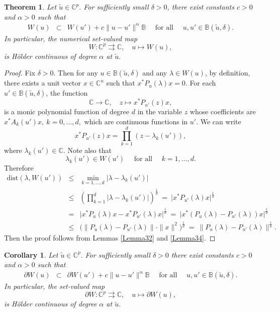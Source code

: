 \documentclass[10pt,reqno]{amsart}
\theoremstyle{break-italic}
\theoremstyle{break-italic}
\theoremstyle{break-italic}
\theoremstyle{break-italic}
\theoremstyle{break-italic}
\theoremstyle{break-italic}
\theoremstyle{break-italic}
\theoremstyle{break-italic}
\newtheorem{theorem}[satz]{Theorem}
\newtheorem{corollary}[satz]{Corollary}
\theoremstyle{break-roman}
\theoremstyle{standard}
\theoremstyle{varthm-roman}
\theoremstyle{varthm-italic}
\theoremstyle{varthm-roman-break}
\theoremstyle{varthm-italic-break}
\theoremstyle{varthm-roman-no-punctuation}
\theoremstyle{varthm-italic-no-punctuation}
\numberwithin{equation}{section}
\begin{document}
\begin{theorem}\label{Theorem33}
Let $\tilde{u} \in \mathbb{C}^p.$ For sufficiently small $\delta > 0$, there exist constants $c > 0$ and $\alpha > 0$ such that
\begin{eqnarray*}
W(u) &\subset& W(u') + c \|u - u'\|^\alpha \mathbb{B} \quad \textrm{ for all } \quad u, u' \in \mathbb{B}(\tilde{u}, \delta).
\end{eqnarray*}
In particular, the numerical  set-valued map
$$W \colon \mathbb{C}^p \rightrightarrows \mathbb{C}, \quad u \mapsto W(u),$$
is H\"older continuous of degree $\alpha$ at $\tilde{u}.$
\end{theorem}

\begin{proof}
Fix $\delta > 0.$ Then for any $u\in \mathbb{B}(\tilde{u}, \delta)$ and any $\lambda \in W(u)$, by definition, there exists a unit vector $x\in \mathbb C^n$ such that $x^*P_u(\lambda)x =0$. For each  $u'\in \mathbb{B}(\tilde{u}, \delta)$, the function
$$ \mathbb C \rightarrow \mathbb C, \quad  z\mapsto x^*P_{u'}(z)x,$$
is a monic polynomial function of degree $d $ in the variable $z$ whose  coefficients are  $x^*A_k(u')x, ~k=0,\ldots, d,$ which are continuous functions in $u'.$ We can write
$$ x^* P_{u'}(z)x = \prod_{k = 1}^d (z - \lambda_k(u')),$$
where $\lambda_k(u')\in \mathbb C$. Note also that
$$ \lambda_k(u') \in W(u') \quad \textrm{ for all } \quad k = 1,\ldots,d.$$
Therefore
\begin{eqnarray*}
\mathrm{dist}(\lambda, W(u')) & \leq & \min_{k = 1,\ldots,d} |\lambda - \lambda_k(u')|\\
& \leq & \left(\prod_{k = 1}^d |\lambda - \lambda_k(u')| \right)^{\frac{1}{d}} \ = \ \big |x^*P_{u'}(\lambda) x \big |^{\frac{1}{d}} \\
& = & \big |x^*P_{u}(\lambda) x-x^*P_{u'}(\lambda) x \big |^{\frac{1}{d}} \ = \ \big |x^*(P_{u}(\lambda)-P_{u'}(\lambda))x \big |^{\frac{1}{d}}\\
& \leq & \bigg(\|P_{u}(\lambda)-P_{u'}(\lambda)\| \cdot \|x\|^2\bigg)^{\frac{1}{d}} \ =  \ \big \|P_{u}(\lambda)-P_{u'}(\lambda) \big \|^{\frac{1}{d}}.
\end{eqnarray*}
Then the proof follows from Lemmas \ref{Lemma32} and \ref{Lemma34}.
\end{proof}

\begin{corollary}\label{coro31}
Let $\tilde{u} \in \mathbb{C}^p.$ For  sufficiently small $\delta > 0$ there exist constants $c > 0$ and $\alpha > 0$ such that
\begin{eqnarray*}
\partial W(u) &\subset& \partial W(u') + c \|u - u'\|^\alpha \mathbb{B} \quad \textrm{ for all } \quad u, u' \in \mathbb{B}(\tilde{u}, \delta).
\end{eqnarray*}
In particular, the set-valued map
$$\partial  W \colon \mathbb{C}^p \rightrightarrows \mathbb{C}, \quad u \mapsto \partial W(u),$$
is H\"older continuous of degree $\alpha$ at $\tilde{u}.$
\end{corollary}
\end{document}
